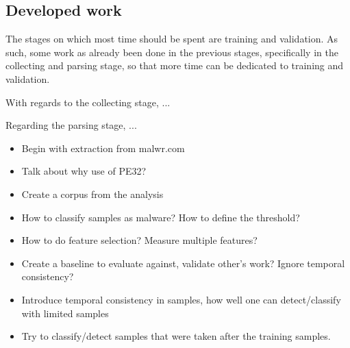 \documentclass{llncs}
\begin{document}

\subsection{Developed work}
The stages on which most time should be spent are training and validation. As such, some work as already been done in the previous stages, specifically in the collecting and parsing stage, so that more time can be dedicated to training and validation.

With regards to the collecting stage, ...

Regarding the parsing stage, ...

\clearpage

\begin{itemize}
	\item Begin with extraction from malwr.com
	\item Talk about why use of PE32?
	\item Create a corpus from the analysis
	\item How to classify samples as malware? How to define the threshold?
	\item How to do feature selection? Measure multiple features?
	\item Create a baseline to evaluate against, validate other's work? Ignore temporal consistency?
	\item Introduce temporal consistency in samples, how well one can detect/classify with limited samples
	\item Try to classify/detect samples that were taken after the training samples.
\end{itemize}



\end{document}

